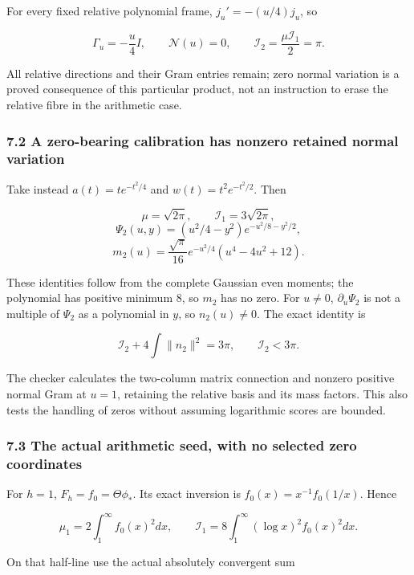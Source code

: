 For every fixed relative polynomial frame, \(j_u'=-(u/4)j_u\), so

\[\Gamma_u=-\frac u4I,\qquad \mathcal N(u)=0,\qquad
\mathcal I_2=\frac{\mu\mathcal I_1}{2}=\pi.\tag{7.1}\]

All relative directions and their Gram entries remain; zero normal
variation is a proved consequence of this particular product, not an
instruction to erase the relative fibre in the arithmetic case.

\subsubsection{7.2 A zero-bearing calibration has nonzero retained
normal
variation}\label{sum_connection:a-zero-bearing-calibration-has-nonzero-retained-normal-variation}

Take instead \(a(t)=t e^{-t^2/4}\) and \(w(t)=t^2e^{-t^2/2}\). Then

\[\mu=\sqrt{2\pi},\qquad \mathcal I_1=3\sqrt{2\pi},\]
\[\Psi_2(u,y)=(u^2/4-y^2)e^{-u^2/8-y^2/2},\]
\[m_2(u)=\frac{\sqrt\pi}{16}e^{-u^2/4}(u^4-4u^2+12).\tag{7.2}\]

These identities follow from the complete Gaussian even moments; the
polynomial has positive minimum \(8\), so \(m_2\) has no zero. For
\(u\ne0\), \(\partial_u\Psi_2\) is not a multiple of \(\Psi_2\) as a
polynomial in \(y\), so \(n_2(u)\ne0\). The exact identity is

\[\mathcal I_2+4\int\|n_2\|^2=3\pi,\qquad \mathcal I_2<3\pi.\tag{7.3}\]

The checker calculates the two-column matrix connection and nonzero
positive normal Gram at \(u=1\), retaining the relative basis and its
mass factors. This also tests the handling of zeros without assuming
logarithmic scores are bounded.

\subsubsection{7.3 The actual arithmetic seed, with no selected zero
coordinates}\label{sum_connection:the-actual-arithmetic-seed-with-no-selected-zero-coordinates}

For \(h=1\), \(F_h=f_0=\Theta\phi_*\). Its exact inversion is
\(f_0(x)=x^{-1}f_0(1/x)\). Hence

\[\mu_1=2\int_1^\infty f_0(x)^2dx,\qquad
\mathcal I_1=8\int_1^\infty(\log x)^2 f_0(x)^2dx.\tag{7.4}\]

On that half-line use the actual absolutely convergent sum


